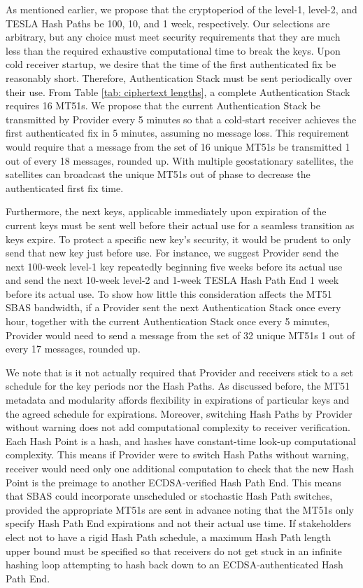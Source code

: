 \documentclass[letterpaper,times]{IONconf/IONconf}
\begin{document}
As mentioned earlier, we propose that the cryptoperiod of the level-1, level-2, and TESLA Hash Paths be 100, 10, and 1 week, respectively.
Our selections are arbitrary, but any choice must meet security requirements that they are much less than the required exhaustive computational time to break the keys.
Upon cold receiver startup, we desire that the time of the first authenticated fix be reasonably short.
Therefore, Authentication Stack must be sent periodically over their use.
From Table \ref{tab: ciphertext lengths}, a complete Authentication Stack requires 16 MT51s. 
We propose that the current Authentication Stack be transmitted by Provider every 5 minutes so that a cold-start receiver achieves the first authenticated fix in 5 minutes, assuming no message loss.
This requirement would require that a message from the set of 16 unique MT51s be transmitted 1 out of every 18 messages, rounded up.
With multiple geostationary satellites, the satellites can broadcast the unique MT51s out of phase to decrease the authenticated first fix time.

Furthermore, the next keys, applicable immediately upon expiration of the current keys must be sent well before their actual use for a seamless transition as keys expire.
To protect a specific new key's security, it would be prudent to only send that new key just before use.
For instance, we suggest Provider send the next 100-week level-1 key repeatedly beginning five weeks before its actual use and send the next 10-week level-2 and 1-week TESLA Hash Path End 1 week before its actual use.
To show how little this consideration affects the MT51 SBAS bandwidth, if a Provider sent the next Authentication Stack once every hour, together with the current Authentication Stack once every 5 minutes, Provider would need to send a message from the set of 32 unique MT51s 1 out of every 17 messages, rounded up.

We note that is it not actually required that Provider and receivers stick to a set schedule for the key periods nor the Hash Paths.
As discussed before, the MT51 metadata and modularity affords flexibility in expirations of particular keys and the agreed schedule for expirations.
Moreover, switching Hash Paths by Provider without warning does not add computational complexity to receiver verification.
Each Hash Point is a hash, and hashes have constant-time look-up computational complexity.
This means if Provider were to switch Hash Paths without warning, receiver would need only one additional computation to check that the new Hash Point is the preimage to another ECDSA-verified Hash Path End.
This means that SBAS could incorporate unscheduled or stochastic Hash Path switches, provided the appropriate MT51s are sent in advance noting that the MT51s only specify Hash Path End expirations and not their actual use time.
If stakeholders elect not to have a rigid Hash Path schedule, a maximum Hash Path length upper bound must be specified so that receivers do not get stuck in an infinite hashing loop attempting to hash back down to an ECDSA-authenticated Hash Path End.
\end{document}
